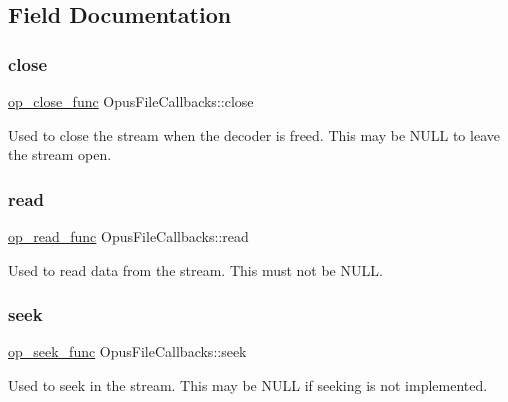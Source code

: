 \subsection{Field Documentation}
\mbox{\label{struct_opus_file_callbacks_a04548cff8eda8ab0322f47cb702fe889}} 
\subsubsection{\texorpdfstring{close}{close}}
{\footnotesize\ttfamily \hyperlink{group__stream__callbacks_ga16c914ec90d301f125cdbeaa1ff57c2d}{op\+\_\+close\+\_\+func} Opus\+File\+Callbacks\+::close}

Used to close the stream when the decoder is freed. This may be {\ttfamily N\+U\+LL} to leave the stream open. \mbox{\label{struct_opus_file_callbacks_a602ea09a84743a8f4fdc76ab7c0b6ee6}} 
\subsubsection{\texorpdfstring{read}{read}}
{\footnotesize\ttfamily \hyperlink{group__stream__callbacks_ga9ffca429db1f3b77f2f303f1942188c3}{op\+\_\+read\+\_\+func} Opus\+File\+Callbacks\+::read}

Used to read data from the stream. This must not be {\ttfamily N\+U\+LL}. \mbox{\label{struct_opus_file_callbacks_acf98bb1d13f75d3770206a398be05c8f}} 
\subsubsection{\texorpdfstring{seek}{seek}}
{\footnotesize\ttfamily \hyperlink{group__stream__callbacks_gae57cb396d1f193d3f4e7e56ddad7760e}{op\+\_\+seek\+\_\+func} Opus\+File\+Callbacks\+::seek}

Used to seek in the stream. This may be {\ttfamily N\+U\+LL} if seeking is not implemented. \mbox{\label{struct_opus_file_callbacks_a1464ae2f33850101add14a7eb278ff1c}} 
